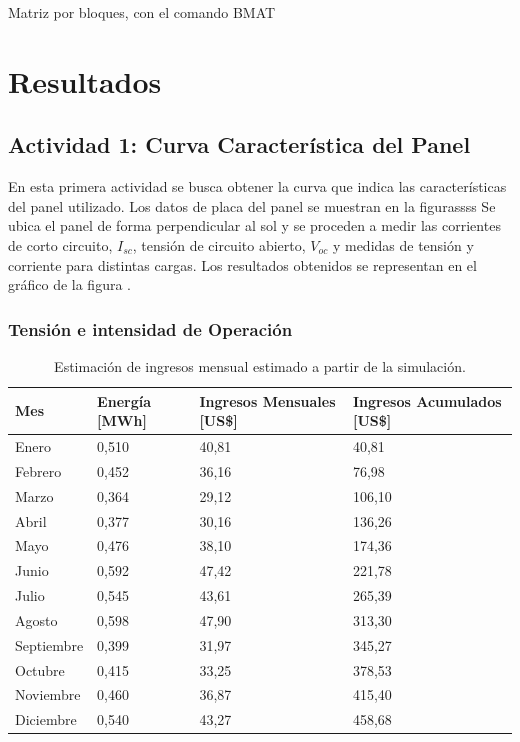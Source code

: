 \documentclass[12pt, letterpaper]{article}
\begin{document}
Matriz por bloques, con el comando BMAT



\newpage
\section{Resultados}

\subsection{Actividad 1: Curva Característica del Panel}
En esta primera actividad se busca obtener la curva que indica las características del panel utilizado. Los datos de placa del panel se muestran en la figurassss
Se ubica el panel de forma perpendicular al sol y se proceden a medir las corrientes de corto circuito, $I_{sc}$, tensión de circuito abierto, $V_{oc}$ y medidas de tensión y corriente para distintas cargas. Los resultados obtenidos se representan en el gráfico de la figura . \cite{explorador}




\subsubsection{Tensión e intensidad de Operación}

\begin{table}[H]
\centering
\begin{tabu} to \textwidth {l X[c] X[c] X[c]}
\toprule
\textbf{Mes} & \textbf{Energía [MWh]} & \textbf{Ingresos Mensuales [US\$]} & \textbf{Ingresos Acumulados [US\$]}\\\midrule
Enero        & 0,510 & 40,81 & 40,81  \\
Febrero      & 0,452 & 36,16 & 76,98  \\
Marzo        & 0,364 & 29,12 & 106,10 \\
Abril        & 0,377 & 30,16 & 136,26 \\
Mayo         & 0,476 & 38,10 & 174,36 \\
Junio        & 0,592 & 47,42 & 221,78 \\
Julio        & 0,545 & 43,61 & 265,39 \\
Agosto       & 0,598 & 47,90 & 313,30 \\
Septiembre   & 0,399 & 31,97 & 345,27 \\
Octubre      & 0,415 & 33,25 & 378,53 \\
Noviembre    & 0,460 & 36,87 & 415,40 \\
Diciembre    & 0,540 & 43,27 & 458,68 \\
\bottomrule
\end{tabu}
\caption{Estimación de ingresos mensual estimado a partir de la simulación.}
\label{tabla2}
\end{table}
\end{document}
